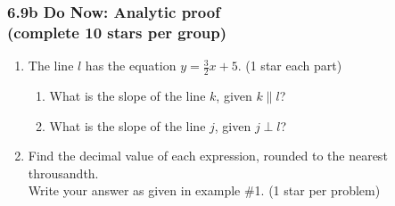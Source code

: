 \documentclass[12pt, twoside]{article}
\begin{document}
\subsubsection*{6.9b Do Now: Analytic proof\\[0.25cm]
(complete 10 stars per group)}
  \begin{enumerate}

  \item The line $l$ has the equation $y=\frac{3}{2}x+5$. \hfill (1 star each part)
    \begin{enumerate}
      \item What is the slope of the line $k$, given $k \parallel l$?
      \vspace{0.5cm}
      \item What is the slope of the line $j$, given $j \perp l$?
      \vspace{0.5cm}
    \end{enumerate}

  \item Find the decimal value of each expression, rounded to the nearest throusandth. \\[0.25cm]
  Write your answer as given in example \#1. \hfill (1 star per problem)
    \begin{enumerate}
    \end{enumerate}
    \vspace{1.5cm}


\end{enumerate}
\end{document}
